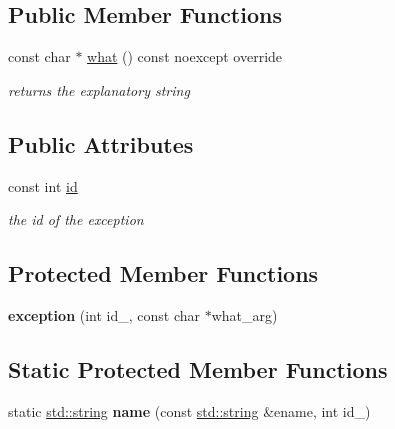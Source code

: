 \subsection*{Public Member Functions}
\begin{DoxyCompactItemize}
\item 
\mbox{\label{classnlohmann_1_1detail_1_1exception_a0672c25ecdf14d1a071d4d6478a65af0}} 
const char $\ast$ \hyperlink{classnlohmann_1_1detail_1_1exception_a0672c25ecdf14d1a071d4d6478a65af0}{what} () const noexcept override
\begin{DoxyCompactList}\small\item\em returns the explanatory string \end{DoxyCompactList}\end{DoxyCompactItemize}
\subsection*{Public Attributes}
\begin{DoxyCompactItemize}
\item 
\mbox{\label{classnlohmann_1_1detail_1_1exception_a0d4589a3fb54e81646d986c05efa3b9a}} 
const int \hyperlink{classnlohmann_1_1detail_1_1exception_a0d4589a3fb54e81646d986c05efa3b9a}{id}
\begin{DoxyCompactList}\small\item\em the id of the exception \end{DoxyCompactList}\end{DoxyCompactItemize}
\subsection*{Protected Member Functions}
\begin{DoxyCompactItemize}
\item 
\mbox{\label{classnlohmann_1_1detail_1_1exception_ae323ad0d53bc724414c2233164e65657}} 
{\bfseries exception} (int id\+\_\+, const char $\ast$what\+\_\+arg)
\end{DoxyCompactItemize}
\subsection*{Static Protected Member Functions}
\begin{DoxyCompactItemize}
\item 
\mbox{\label{classnlohmann_1_1detail_1_1exception_abf41a7e9178356314082284e6cfea278}} 
static \hyperlink{namespacenlohmann_1_1detail_a1ed8fc6239da25abcaf681d30ace4985ab45cffe084dd3d20d928bee85e7b0f21}{std\+::string} {\bfseries name} (const \hyperlink{namespacenlohmann_1_1detail_a1ed8fc6239da25abcaf681d30ace4985ab45cffe084dd3d20d928bee85e7b0f21}{std\+::string} \&ename, int id\+\_\+)
\end{DoxyCompactItemize}


